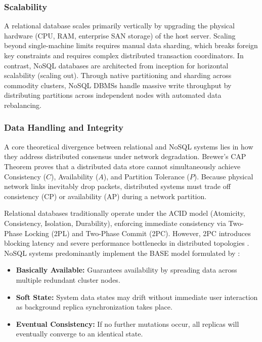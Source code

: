\documentclass[11pt,a4paper]{article}
\begin{document}
\subsubsection*{Scalability}
A relational database scales primarily vertically by upgrading the physical hardware (CPU, RAM, enterprise SAN storage) of the host server. Scaling beyond single-machine limits requires manual data sharding, which breaks foreign key constraints and requires complex distributed transaction coordinators. In contrast, NoSQL databases are architected from inception for horizontal scalability (scaling out). Through native partitioning and sharding across commodity clusters, NoSQL DBMSs handle massive write throughput by distributing partitions across independent nodes with automated data rebalancing.

\subsubsection*{Data Handling and Integrity}
A core theoretical divergence between relational and NoSQL systems lies in how they address distributed consensus under network degradation. Brewer's CAP Theorem \citep{brewer2000, gilbert2002} proves that a distributed data store cannot simultaneously achieve Consistency ($C$), Availability ($A$), and Partition Tolerance ($P$). Because physical network links inevitably drop packets, distributed systems must trade off consistency ($\mathrm{CP}$) or availability ($\mathrm{AP}$) during a network partition.

Relational databases traditionally operate under the ACID model (Atomicity, Consistency, Isolation, Durability), enforcing immediate consistency via Two-Phase Locking (2PL) and Two-Phase Commit (2PC). However, 2PC introduces blocking latency and severe performance bottlenecks in distributed topologies \citep{stonebraker2010}. NoSQL systems predominantly implement the BASE model formulated by \citet{pritchett2008}:
\begin{itemize}[noitemsep]
    \item \textbf{Basically Available:} Guarantees availability by spreading data across multiple redundant cluster nodes.
    \item \textbf{Soft State:} System data states may drift without immediate user interaction as background replica synchronization takes place.
    \item \textbf{Eventual Consistency:} If no further mutations occur, all replicas will eventually converge to an identical state.
\end{itemize}
\end{document}
